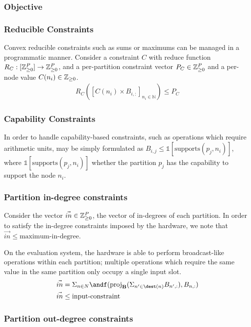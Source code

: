 \subsubsection{Objective}

\subsubsection{Reducible Constraints}
Convex reducible constraints such as sums or maximums can be managed in a programmatic manner. Consider a constraint $C$ with reduce function $R_C: [\mathbb{Z}_{\ge 0}^{P}] \to \mathbb{Z}_{\ge 0}^P$, and a per-partition constraint vector $P_C \in \mathbb{Z}_{\ge 0}^P$ and a per-node value $C(n_i) \in \mathbb{Z}_{\ge 0}$.
\begin{align}
	R_C\left([C(n_i) \times B_{i, :}]_{n_i \in \mathbb{N}} \right) \le P_C
\end{align}

\subsubsection{Capability Constraints}
In order to handle capability-based constraints, such as operations which require arithmetic units, may be simply formulated as $B_{i, j} \le \mathbb{1}[\text{supports}(p_j, n_i)]$, where $ \mathbb{1}[\text{supports}(p_j, n_i)]$ whether the partition $p_j$ has the capability to support the node $n_i$.

\subsubsection{Partition in-degree constraints}
Consider the vector $\vec{in} \in \mathbb{Z}_{\ge 0}^{P}$, the vector of in-degrees of each partition. In order to satisfy the in-degree constraints imposed by the hardware, we note that $\vec{in} \le \text{maximum-in-degree}$.

On the evaluation system, the hardware is able to perform broadcast-like operations within each partition; multiple operations which require the same value in the same partition only occupy a single input slot.
\begin{align*}
\vec{in} &= \Sigma_{n \in N} \andf(\projb{\Sigma_{n' \in \dest(n)} B_{n', :}}, B_{n, :})\\
\vec{in} &\le \textrm{input-constraint}
\end{align*}

\subsubsection{Partition out-degree constraints}

